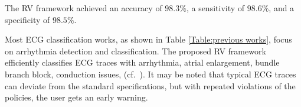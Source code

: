 The RV framework achieved an accuracy of $98.3\%$, a sensitivity of $98.6\%$, and a specificity of $98.5\%$.


Most ECG classification works, as shown in Table \ref{Table:previous works}, focus on arrhythmia detection and classification. The proposed RV framework efficiently classifies ECG traces with arrhythmia, atrial enlargement, bundle branch block, conduction issues, \etc (cf.~\cite{}). It may be noted that typical ECG traces can deviate from the standard specifications, but with repeated violations of the policies, the user gets an early warning.


